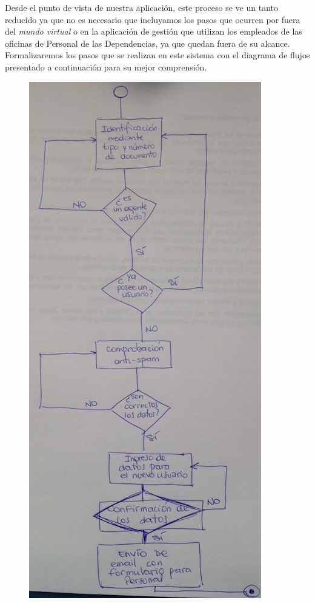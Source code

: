 Desde el punto de vista de nuestra aplicación, este proceso se ve un tanto reducido ya que no es necesario que incluyamos los pasos que ocurren por fuera del \textit{mundo virtual} o en la aplicación de gestión que utilizan los empleados de las oficinas de Personal de las Dependencias, ya que quedan fuera de su alcance. Formalizaremos los pasos que se realizan en este sistema con el diagrama de flujos presentado a continuación para su mejor comprensión.

\begin{figure}[H]
  \centering
  \includegraphics[width=\textwidth,height=0.5\textheight,keepaspectratio]{src/images/05-capitulo-5/diagrama-flujo-registro.jpg}

\end{figure}
